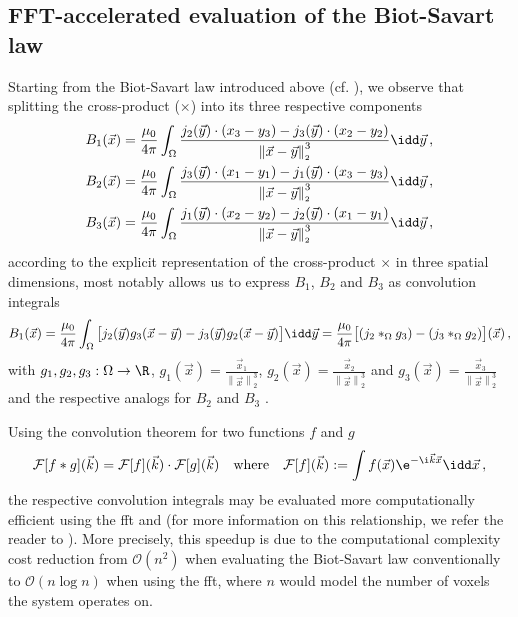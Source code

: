 \documentclass[10pt]{article}
\renewcommand{\norm}[1]{\left\lVert#1\right\rVert_{\scriptscriptstyle 2}}
\begin{document}
  \subsection{FFT-accelerated evaluation of the Biot-Savart law}
  \label{sec:fft-biot}
  Starting from the Biot-Savart law introduced above (cf. ), we observe that splitting the cross-product ($\times$) into its three respective components
  \begin{align*}
    B_1(\vec{x}) & = \frac{\mu_0}{4\pi} \int_{\Omega} \frac{j_2(\vec{y}) \cdot (x_3 - y_3) - j_3(\vec{y}) \cdot (x_2 - y_2)}{\norm{\vec{x} - \vec{y}}^3} \idd\vec{y} \,, \\
    B_2(\vec{x}) & = \frac{\mu_0}{4\pi} \int_{\Omega} \frac{j_3(\vec{y}) \cdot (x_1 - y_1) - j_1(\vec{y}) \cdot (x_3 - y_3)}{\norm{\vec{x} - \vec{y}}^3} \idd\vec{y} \,, \\
    B_3(\vec{x}) & = \frac{\mu_0}{4\pi} \int_{\Omega} \frac{j_1(\vec{y}) \cdot (x_2 - y_2) - j_2(\vec{y}) \cdot (x_1 - y_1)}{\norm{\vec{x} - \vec{y}}^3} \idd\vec{y} \,,
  \end{align*}
  according to the explicit representation of the cross-product $\times$ in three spatial dimensions, most notably allows us to express $B_1$, $B_2$ and $B_3$ as convolution integrals
  $$B_1(\vec{x}) = \frac{\mu_0}{4\pi} \int_{\Omega} \big[j_2(\vec{y}) g_3(\vec{x} - \vec{y}) - j_3(\vec{y}) g_2(\vec{x} - \vec{y})\big]\idd\vec{y} = \frac{\mu_0}{4\pi} \big[(j_2 *_{\Omega} g_3) - (j_3 *_{\Omega} g_2)\big](\vec{x})\,,$$
  with $g_1, g_2, g_3: \Omega \to \R$, $g_1(\vec{x}) = \frac{\vec{x}_1}{\norm{\vec{x}}^3}$, $g_2(\vec{x}) = \frac{\vec{x}_2}{\norm{\vec{x}}^3}$ and $g_3(\vec{x}) = \frac{\vec{x}_3}{\norm{\vec{x}}^3}$ and the respective analogs for $B_2$ and $B_3$ \parencite{2020-biot-savart-evaluation-fft}.

  Using the convolution theorem for two functions $f$ and $g$
  $$\mathcal{F}[f * g](\vec{k}) = \mathcal{F}[f](\vec{k}) \cdot \mathcal{F}[g](\vec{k}) \quad\text{where}\quad \mathcal{F}[f](\vec{k}) := \int f(\vec{x}) \e^{-\i \vec{k} \vec{x}}\idd\vec{x}\,,$$
  the respective convolution integrals may be evaluated more computationally efficient using the \gls{fft} and  (for more information on this relationship, we refer the reader to \cite{2022-convolution-theorem}).
  More precisely, this speedup is due to the computational complexity cost reduction from $\mathcal{O}(n^2)$ when evaluating the Biot-Savart law conventionally to $\mathcal{O}(n \log n)$ when using the \gls{fft}, where $n$ would model the number of voxels the system operates on.
\end{document}

